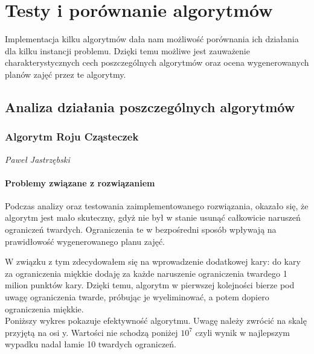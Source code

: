 \chapter{Testy i porównanie algorytmów}
Implementacja kilku algorytmów dała nam możliwość porównania ich działania dla kilku instancji problemu. Dzięki temu możliwe jest zauważenie charakterystycznych cech poszczególnych algorytmów oraz ocena wygenerowanych planów zajęć przez te algorytmy.
\section{Analiza działania poszczególnych algorytmów}
\subsection{Algorytm Roju Cząsteczek}
\textit{Paweł Jastrzębski} \\
\subsubsection{Problemy związane z rozwiązaniem}
\par Podczas analizy oraz testowania zaimplementowanego rozwiązania, okazało się, że algorytm jest mało skuteczny, gdyż nie był w stanie usunąć całkowicie naruszeń ograniczeń twardych. Ograniczenia te w bezpośredni sposób wpływają na prawidłowość wygenerowanego planu zajęć.
\par W związku z tym zdecydowałem się na wprowadzenie dodatkowej kary: do kary za ograniczenia miękkie dodaję za każde naruszenie ograniczenia twardego 1 milion punktów kary. Dzięki temu, algorytm w pierwszej kolejności bierze pod uwagę ograniczenia twarde, próbując je wyeliminować, a potem dopiero ograniczenia miękkie. \\

Poniższy wykres pokazuje efektywność algorytmu. Uwagę należy zwrócić na skalę przyjętą na osi y. Wartości nie schodzą poniżej $10^{7}$ czyli wynik w najlepszym wypadku nadal łamie 10 twardych ograniczeń.

